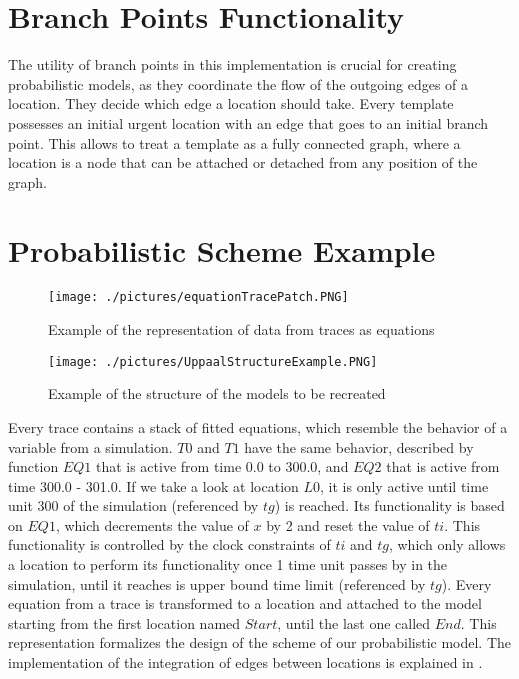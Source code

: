 \section{Branch Points Functionality}
The utility of branch points in this implementation is crucial for creating probabilistic models, as they coordinate the flow of the outgoing edges of a location.
%
They decide which edge a location should take.
%
Every template possesses an initial urgent location with an edge that goes to an initial branch point.
%
This allows to treat a template as a fully connected graph, where a location is a node that can be attached or detached from any position of the graph. 
\newpage
\section{Probabilistic Scheme Example}
\begin{figure}[h]
	\centering
	\caption{Example of the representation of data from traces as equations}
	\texttt{[image: ./pictures/equationTracePatch.PNG]}
\end{figure}

\begin{figure}[h]
	\centering
	\caption{Example of the structure of the models to be recreated}
	\texttt{[image: ./pictures/UppaalStructureExample.PNG]}
\end{figure}

Every trace contains a stack of fitted equations, which resemble the behavior of a variable from a simulation.
%
$T0$ and $T1$ have the same behavior, described by function $EQ1$ that is active from time 0.0 to 300.0, and $EQ2$ that is active from time 300.0 - 301.0.
%
If we take a look at location $L0$, it is only active until time unit 300 of the simulation (referenced by $tg$) is reached.
%
Its functionality is based on $EQ1$, which decrements the value of $x$ by 2 and reset the value of $ti$.
%
This functionality is controlled by the clock constraints of $ti$ and $tg$, which only allows a location to perform its functionality once 1 time unit passes by in the simulation, until it reaches is upper bound time limit (referenced by $tg$).
%
Every equation from a trace is transformed to a location and attached to the model starting from the first location named $Start$, until the last one called $End$. 
%
This representation formalizes the design of the scheme of our probabilistic model. 
%
The implementation of the integration of edges between locations is explained in . 

